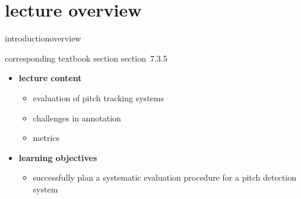 


\subtitle{Module 7.3.5: Fundamental Frequency Detection~---~Evaluation}


	

    \section[overview]{lecture overview}
        \begin{frame}{introduction}{overview}
            \begin{block}{corresponding textbook section}
                    section~7.3.5
            \end{block}

            \begin{itemize}
                \item   \textbf{lecture content}
                    \begin{itemize}
                        \item   evaluation of pitch tracking  systems
                        \item   challenges in annotation
                        \item   metrics
                    \end{itemize}
                \bigskip
                \item<2->   \textbf{learning objectives}
                    \begin{itemize}
                        \item   successfully plan a systematic evaluation procedure for a pitch detection system
                    \end{itemize}
            \end{itemize}
        \end{frame}
        
